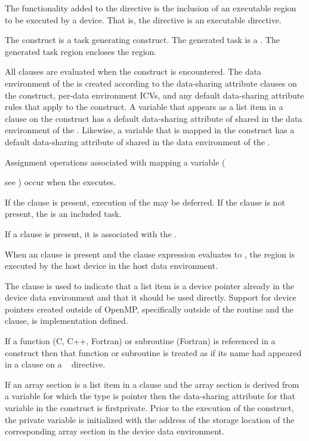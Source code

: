 {{The functionality added to the  directive is the inclusion of an executable region to be executed by a device. That is, the  directive is an executable directive.

The  construct is a task generating construct.  The generated task is a .  The generated task region encloses the  region.

All clauses are evaluated when the  construct is encountered.  The data environment of the  is created according to the data-sharing attribute clauses on the  construct, per-data environment ICVs, and any default data-sharing attribute rules that apply to the  construct.  A variable that appears as a list item in a  clause on the  construct has a default data-sharing attribute of shared in the data environment of the . Likewise, a variable that is mapped in the  construct has a default data-sharing attribute of shared in the data environment of the .

Assignment operations associated with mapping a variable ({see ) occur when the  executes.

If the  clause is present, execution of the  may be deferred.  If the  clause is not present, the  is an included task.

If a  clause is present, it is associated with the .

When an  clause is present and the  clause expression evaluates to , the  region is executed by the host device in the host data environment.

The  clause is used to indicate that a list item is a device
pointer already in the device data environment and that it should be used
directly.  Support for device pointers created outside of OpenMP, specifically
outside of the  routine and the  clause,
is implementation defined.

If a function (C, C++, Fortran) or subroutine (Fortran) is referenced in a
 construct then that function or subroutine is treated as if its
name had appeared in a  clause on a ~
directive.

\ccppspecificstart
If an array section is a list item in a  clause and the array section is derived from a variable for which the type is pointer then the data-sharing attribute for that variable in the construct is firstprivate.  Prior to the execution of the construct, the private variable is initialized with the address of the storage location of the corresponding array section in the device data environment.

}}}

